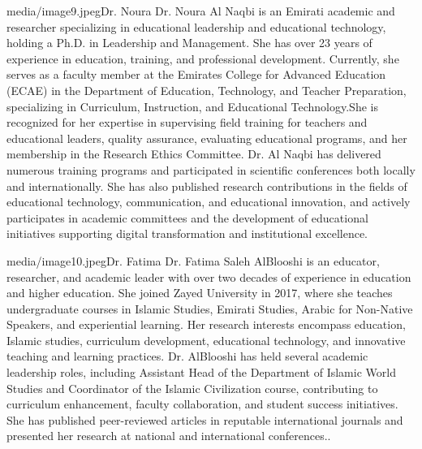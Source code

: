 \documentclass{NSP1}
\begin{document}
\begin{biographyps}{media/image9.jpeg}{Dr. Noura}
Dr. Noura Al Naqbi is an Emirati academic and researcher specializing in educational leadership and educational technology, holding a Ph.D. in Leadership and Management. She has over 23 years of experience in education, training, and professional development. Currently, she serves as a faculty member at the Emirates College for Advanced Education (ECAE) in the Department of Education, Technology, and Teacher Preparation, specializing in Curriculum, Instruction, and Educational Technology.She is recognized for her expertise in supervising field training for teachers and educational leaders, quality assurance, evaluating educational programs, and her membership in the Research Ethics Committee. Dr. Al Naqbi has delivered numerous training programs and participated in scientific conferences both locally and internationally. She has also published research contributions in the fields of educational technology, communication, and educational innovation, and actively participates in academic committees and the development of educational initiatives supporting digital transformation and institutional excellence.\end{biographyps}

\begin{biographyps}{media/image10.jpeg}{Dr. Fatima}
Dr. Fatima Saleh AlBlooshi is an educator, researcher, and academic leader with over two decades of experience in education and higher education. She joined Zayed University in 2017, where she teaches undergraduate courses in Islamic Studies, Emirati Studies, Arabic for Non-Native Speakers, and experiential learning. Her research interests encompass education, Islamic studies, curriculum development, educational technology, and innovative teaching and learning practices. Dr. AlBlooshi has held several academic leadership roles, including Assistant Head of the Department of Islamic World Studies and Coordinator of the Islamic Civilization course, contributing to curriculum enhancement, faculty collaboration, and student success initiatives. She has published peer-reviewed articles in reputable international journals and presented her research at national and international conferences..\end{biographyps}
\end{document}
